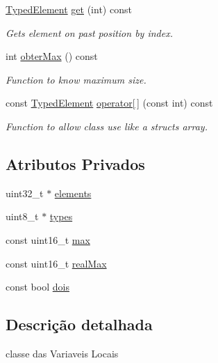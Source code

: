 \begin{DoxyCompactItemize}
\hyperlink{BasicTypes_8h_a97b332303b1262282599e6ede0637b82}{Typed\+Element} \hyperlink{classLocalVariables_a4abbb4a732d7dd0f11a147b79c15ae10}{get} (int) const
\begin{DoxyCompactList}\small\item\em Gets element on past position by index. \end{DoxyCompactList}\item 
int \hyperlink{classLocalVariables_acf8ee1db2a3427c30eb3e489d7a4478c}{obter\+Max} () const
\begin{DoxyCompactList}\small\item\em Function to know maximum size. \end{DoxyCompactList}\item 
const \hyperlink{BasicTypes_8h_a97b332303b1262282599e6ede0637b82}{Typed\+Element} \hyperlink{classLocalVariables_a6e978f3c992385f2909261e995105142}{operator\mbox{[}$\,$\mbox{]}} (const int) const
\begin{DoxyCompactList}\small\item\em Function to allow class use like a struct\textquotesingle{}s array. \end{DoxyCompactList}\end{DoxyCompactItemize}
\subsection*{Atributos Privados}
\begin{DoxyCompactItemize}
\item 
uint32\+\_\+t $\ast$ \hyperlink{classLocalVariables_a0015e9d8a61d4643f6f3594785467ae4}{elements}
\item 
uint8\+\_\+t $\ast$ \hyperlink{classLocalVariables_ac73d4583cc3f8b295c8c986cee21fe30}{types}
\item 
const uint16\+\_\+t \hyperlink{classLocalVariables_a55f33aaf9a0af5176d460616402c4aeb}{max}
\item 
const uint16\+\_\+t \hyperlink{classLocalVariables_a892e685ce3c1c5e6da9e1db542d865e9}{real\+Max}
\item 
const bool \hyperlink{classLocalVariables_a8357edb6ae793a8f031ae3733751e1fc}{dois}
\end{DoxyCompactItemize}


\subsection{Descrição detalhada}
classe das Variaveis Locais 

